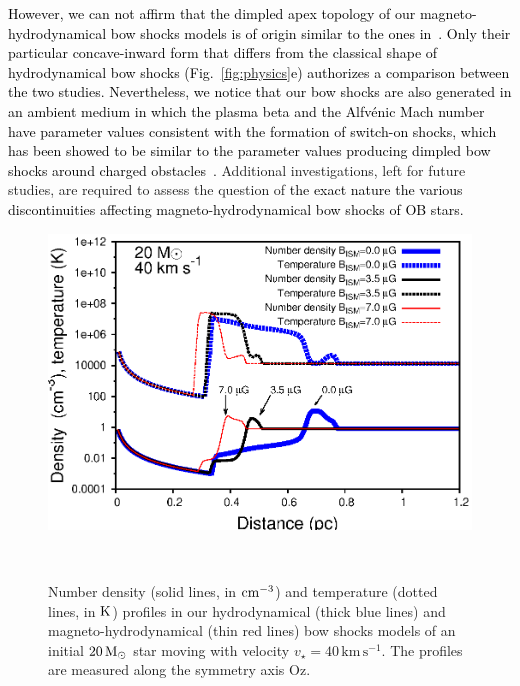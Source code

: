 \documentclass[useAMS,usenatbib]{mn2e}
\begin{document}
\textcolor{black}{However, we can not affirm that the dimpled apex topology of our 
magneto-hydrodynamical bow shocks models is of origin similar to the ones 
in~\citet{sterck_phpl_1998,sterck_aa_343_1999}. Only their particular 
concave-inward form that differs from the classical shape of hydrodynamical 
bow shocks (Fig.~\ref{fig:physics}e) authorizes a comparison between the 
two studies. Nevertheless, we notice that our bow shocks are also generated 
in an ambient medium in which the plasma beta and the \textcolor{black}{Alfv\' enic} Mach number 
have parameter values consistent with the formation of switch-on shocks, 
which has been showed to be similar to the parameter values producing dimpled 
bow shocks around charged obstacles~\citep[see][and references therein]
{sterck_phpl_1998,sterck_aa_343_1999}.} Additional investigations, left for future studies, 
are required to assess the question of \textcolor{black}{the exact nature the 
various discontinuities affecting magneto-hydrodynamical bow shocks of OB stars. }


\begin{figure}
	\begin{minipage}[b]{ 0.65\textwidth}
		\includegraphics[width=1.0\textwidth]{./cuts.eps}
	\end{minipage} \\  	
	\caption{
	         Number density (solid lines, in $\rm cm^{-3}$) and temperature 
	         (dotted lines, in $\rm K$) profiles in our hydrodynamical (thick blue lines) 
	         and magneto-hydrodynamical (thin red lines) 
	         bow shocks models of an initial $20\, \rm M_{\odot}$ star moving with velocity 
	         $v_{\star}=40\, \mathrm{km}\, \mathrm{s}^{-1}$. The profiles are measured along the 
	         symmetry axis Oz. 
		 }
	\label{fig:cuts}  
\end{figure}
\end{document}
